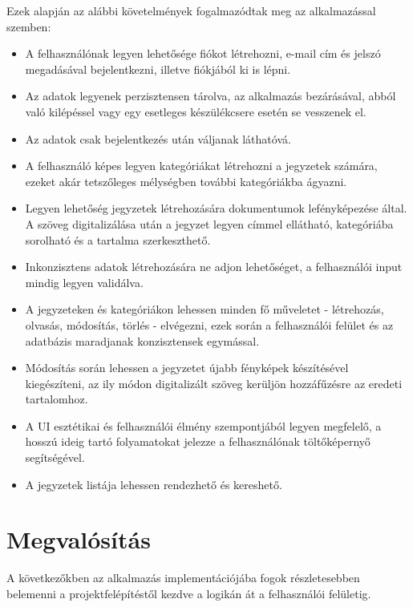 Ezek alapján az alábbi követelmények fogalmazódtak meg az alkalmazással szemben:
\begin{itemize}
	\item A felhasználónak legyen lehetősége fiókot létrehozni, e-mail cím és jelszó megadásával bejelentkezni, illetve fiókjából ki is lépni.
	\item Az adatok legyenek perzisztensen tárolva, az alkalmazás bezárásával, abból való kilépéssel vagy egy esetleges készülékcsere esetén se vesszenek el.
	\item Az adatok csak bejelentkezés után váljanak láthatóvá.
	\item A felhasználó képes legyen kategóriákat létrehozni a jegyzetek számára, ezeket akár tetszőleges mélységben további kategóriákba ágyazni.
	\item Legyen lehetőség jegyzetek létrehozására dokumentumok lefényképezése által. A szöveg digitalizálása után a jegyzet legyen címmel ellátható, kategóriába sorolható és a tartalma szerkeszthető.
	\item Inkonzisztens adatok létrehozására ne adjon lehetőséget, a felhasználói input mindig legyen validálva.
	\item A jegyzeteken és kategóriákon lehessen minden fő műveletet - létrehozás, olvasás, módosítás, törlés - elvégezni, ezek során a felhasználói felület és az adatbázis maradjanak konzisztensek egymással.
	\item Módosítás során lehessen a jegyzetet újabb fényképek készítésével kiegészíteni, az ily módon digitalizált szöveg kerüljön hozzáfűzésre az eredeti tartalomhoz.
	\item A UI esztétikai és felhasználói élmény szempontjából legyen megfelelő, a hosszú ideig tartó folyamatokat jelezze a felhasználónak töltőképernyő segítségével.
	\item A jegyzetek listája lehessen rendezhető és kereshető.
\end{itemize}

\section{Megvalósítás}

A következőkben az alkalmazás implementációjába fogok részletesebben belemenni a projektfelépítéstől kezdve a logikán át a felhasználói felületig.

